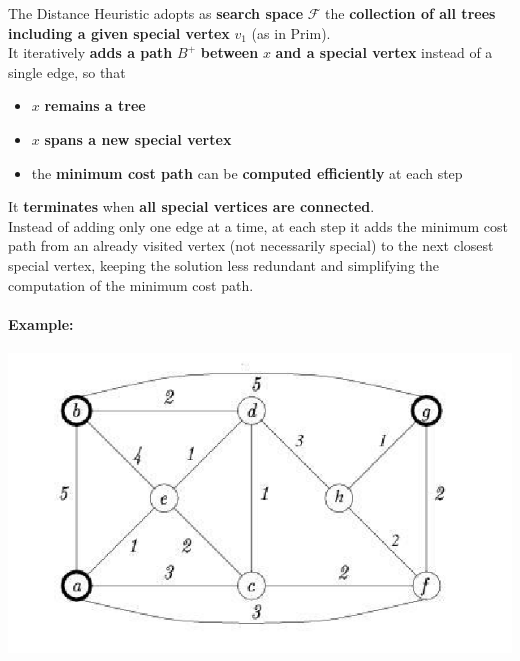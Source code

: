 The Distance Heuristic adopts as \textbf{search space} $\mathcal{F}$ the \textbf{collection of all trees including a given special vertex} $v_1$ (as in Prim).\\

It iteratively \textbf{adds a path} $B^+$ \textbf{between} $x$ \textbf{and a special vertex} instead of a single edge, so that
\begin{itemize}
	\item $x$ \textbf{remains a tree}
	\item $x$ \textbf{spans a new special vertex}
	\item the \textbf{minimum cost path} can be \textbf{computed efficiently} at each step
\end{itemize}

It \textbf{terminates} when \textbf{all special vertices are connected}.\\

Instead of adding only one edge at a time, at each step it adds the minimum cost path from an already visited vertex (not necessarily special) to the next closest special vertex, keeping the solution less redundant and simplifying the computation of the minimum cost path.\\

\newpage

\paragraph{Example:}
\begin{center}
	\includegraphics[width=0.7\columnwidth]{img/STP2}
\end{center}

